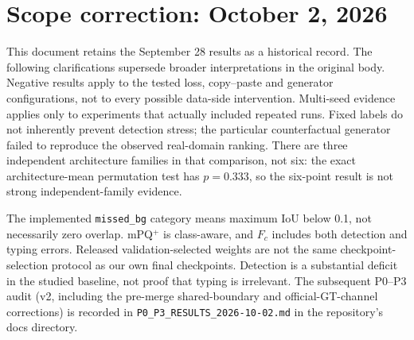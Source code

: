 \section*{Scope correction: October 2, 2026}
This document retains the September 28 results as a historical record. The following
clarifications supersede broader interpretations in the original body. Negative results
apply to the tested loss, copy--paste and generator configurations, not to every possible
data-side intervention. Multi-seed evidence applies only to experiments that actually
included repeated runs. Fixed labels do not inherently prevent detection stress; the
particular counterfactual generator failed to reproduce the observed real-domain ranking.
There are three independent architecture families in that comparison, not six: the exact
architecture-mean permutation test has $p=0.333$, so the six-point result is not strong
independent-family evidence.

The implemented \texttt{missed\_bg} category means maximum IoU below 0.1, not necessarily
zero overlap. mPQ$^+$ is class-aware, and $F_c$ includes both detection and typing errors.
Released validation-selected weights are not the same checkpoint-selection protocol as our
own final checkpoints. Detection is a substantial deficit in the studied baseline, not
proof that typing is irrelevant. The subsequent P0--P3 audit (v2, including the pre-merge
shared-boundary and official-GT-channel corrections) is recorded in
\texttt{P0\_P3\_RESULTS\_2026-10-02.md} in the repository's docs directory.
\clearpage
